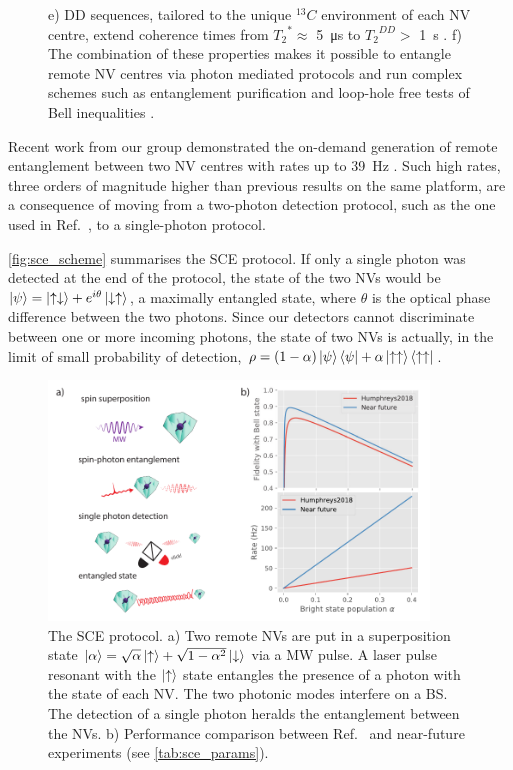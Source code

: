 \documentclass[a4paper]{article}
\begin{document}
\begin{figure}
{		e) \acf{DD} sequences, tailored to the unique ${}^{13} C$ environment of each \ac{NV} centre, extend coherence times from ${T_2}^* \approx $ \SI{5}{\micro s} to ${T_2}^{DD} > $ \SI{1}{s} \cite{Abobeih2018}.
		f) The combination of these properties makes it possible to entangle remote \ac{NV} centres via photon mediated protocols and run complex schemes such as entanglement purification and loop-hole free tests of Bell inequalities \cite{Kalb2017, Hensen2015}.}
	\label{fig:nv_summary}
\end{figure}

Recent work from our group demonstrated the on-demand generation of remote entanglement between two \ac{NV} centres with rates up to \SI{39}{\Hz} \cite{Humphreys2018}. Such high rates, three orders of magnitude higher than previous results on the same platform, are a consequence of moving from a two-photon detection protocol, such as the one used in Ref.~\cite{Hensen2015}, to a single-photon protocol.

\autoref{fig:sce_scheme} summarises the \ac{SCE} protocol. If only a single photon was detected at the end of the protocol, the state of the two \acp{NV} would be $\ket\psi = \ket{\uparrow\downarrow} + e^{i\theta}\ket{\downarrow\uparrow}$, a maximally entangled state, where $\theta$ is the optical phase difference between the two photons. Since our detectors cannot discriminate between one or more incoming photons, the state of two \acp{NV} is actually, in the limit of small probability of detection, $\rho = (1-\alpha)\ket\psi\bra\psi + \alpha\ket{\uparrow\uparrow}\bra{\uparrow\uparrow}$.

\begin{figure}[h]
	\centering
	\includegraphics[width=0.9\textwidth]{images/figure2}
	\caption{The \acf{SCE} protocol.
	a) Two remote \acp{NV} are put in a superposition state $\ket\alpha = \sqrt\alpha\ket\uparrow + \sqrt{1-\alpha^2}\ket\downarrow$ via a \ac{MW} pulse.
	A laser pulse resonant with the $\ket\uparrow$ state entangles the presence of a photon with the state of each \ac{NV}.
	The two photonic modes interfere on a \ac{BS}.
	The detection of a single photon heralds the entanglement between the \acp{NV}.
	b) Performance comparison between Ref.~\cite{Humphreys2018} and near-future experiments (see \autoref{tab:sce_params}).}
	\label{fig:sce_scheme}
\end{figure}
\end{document}
